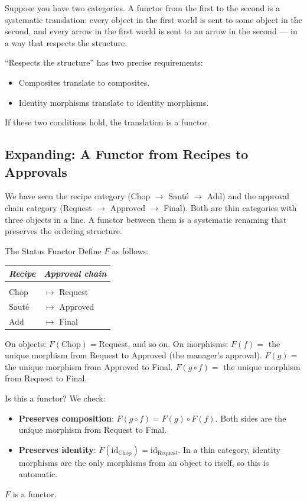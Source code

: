 Suppose you have two categories. A functor from the first to the second is a
systematic translation: every object in the first world is sent to some object
in the second, and every arrow in the first world is sent to an arrow in the
second --- in a way that respects the structure.

``Respects the structure'' has two precise requirements:
\begin{itemize}
  \item Composites translate to composites.
  \item Identity morphisms translate to identity morphisms.
\end{itemize}

If these two conditions hold, the translation is a functor.

\subsection{Expanding: A Functor from Recipes to Approvals}

We have seen the recipe category (Chop $\to$ Sauté $\to$ Add) and the
approval chain category (Request $\to$ Approved $\to$ Final). Both are
thin categories with three objects in a line. A functor between them is
a systematic renaming that preserves the ordering structure.

\begin{example}{The Status Functor}
Define $F$ as follows:

\medskip
\begin{center}
\begin{tabular}{ll}
  \textit{Recipe} & \textit{Approval chain} \\[4pt]
  \hline\\[-6pt]
  Chop & $\mapsto$ Request \\
  Sauté & $\mapsto$ Approved \\
  Add & $\mapsto$ Final \\
\end{tabular}
\end{center}
\medskip

On objects: $F(\mathrm{Chop}) = \mathrm{Request}$, and so on. On morphisms:
$F(f) = $ the unique morphism from Request to Approved (the manager's
approval). $F(g) = $ the unique morphism from Approved to Final. $F(g \circ f)
= $ the unique morphism from Request to Final.

Is this a functor? We check:
\begin{itemize}
  \item \textbf{Preserves composition}: $F(g \circ f) = F(g) \circ F(f)$.
        Both sides are the unique morphism from Request to Final. \checkmark
  \item \textbf{Preserves identity}: $F(\mathrm{id}_{\mathrm{Chop}}) =
        \mathrm{id}_{\mathrm{Request}}$. In a thin category, identity
        morphisms are the only morphisms from an object to itself, so this
        is automatic. \checkmark
\end{itemize}

$F$ is a functor.
\end{example}

